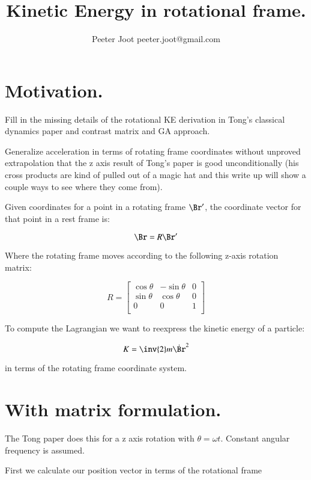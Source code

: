 \documentclass{article}      %
\title{ Kinetic Energy in rotational frame. } %
\author{Peeter Joot \quad peeter.joot@gmail.com}         %
\newcommand{\dt}[1]{\dot{#1}}
\begin{document}

\maketitle{}

\section{ Motivation. }

Fill in the missing details of the rotational KE derivation in Tong's classical
dynamics paper and contrast matrix and GA approach.

Generalize acceleration in terms
of rotating frame coordinates without unproved extrapolation that the z axis result
of Tong's paper is good unconditionally (his cross products are kind of pulled out of
a magic hat and this write up will show a couple ways to see where they come from).

Given coordinates for a point in a rotating frame $\Br'$, the coordinate vector for that point
in a rest frame is:

\begin{equation}\label{eqn:rotcoord}
\Br = R \Br'
\end{equation}

Where the rotating frame moves according to the following z-axis rotation matrix:

\[
R = 
\begin{bmatrix}
\cos \theta & -\sin \theta & 0 \\
\sin \theta & \cos \theta & 0 \\
0 & 0 & 1 \\
\end{bmatrix}
\]

To compute the Lagrangian we want to reexpress the 
kinetic energy of a particle:

\[
K = 
\inv{2} m \dt{\Br}^2
\]

in terms of the rotating frame coordinate system.

\section{ With matrix formulation. }

The Tong paper does this for a z axis rotation with $\theta = \omega t$.
Constant angular frequency is assumed.

First we calculate our position vector in terms of the rotational frame
\end{document}

